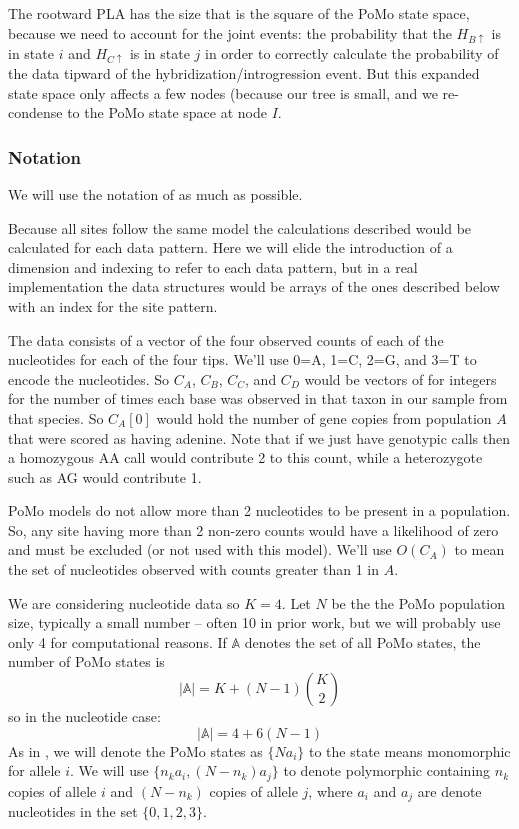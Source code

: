 \documentclass{article}
\begin{document}
The rootward PLA has the size that is the square of the PoMo state space, because we need to account for the joint events: the probability that the $H_{B\uparrow}$ is in state $i$ and $H_{C\uparrow}$ is in state $j$ in order to correctly calculate the probability of the data tipward of the hybridization/introgression event.
But this expanded state space only affects a few nodes (because our tree is small, and we re-condense to the PoMo state space at node $I$.

\subsubsection{Notation}
We will use the notation of \cite{borges2020consistency} as much as possible.

Because all sites follow the same model the calculations described would be calculated for each data pattern.
Here we will elide the introduction of a dimension and indexing to refer to each data pattern, but in a real implementation the data structures would be arrays of the ones described below with an index for the site pattern.

The data consists of a vector of the four observed counts of each of the nucleotides for each of the four tips. 
We'll use 0=A, 1=C, 2=G, and 3=T to encode the nucleotides. So $C_A$, $C_B$, $C_C$, and $C_D$ would be vectors of for integers for the number of times each base was observed in that taxon in our sample from that species.
So $C_A[0]$ would hold the number of gene copies from population $A$ that were scored as having adenine.
Note that if we just have genotypic calls then a homozygous AA call would contribute 2 to this count, while a heterozygote such as AG would contribute 1.



PoMo models do not allow more than 2 nucleotides to be present in a population. So, any site having more than 2 non-zero counts would have a likelihood of zero and must be excluded (or not used with this model).
We'll use $O(C_A)$ to mean the set of nucleotides observed with counts greater than 1 in $A$.




We are considering nucleotide data so $K=4$.
Let $N$ be the the PoMo population size, typically a small number -- often 10 in prior work, but we will probably use only 4 for computational reasons.
If $\mathbb{A}$ denotes the set of all PoMo states, the number of PoMo states is $$|\mathbb{A}| = K + (N-1) {K \choose 2} $$
so in the nucleotide case:
$$|\mathbb{A}| = 4 + 6(N-1)$$
As in \cite{borges2020consistency}, we will denote the PoMo states as $\{N a_i \}$ to the state means monomorphic for allele $i$.
We will use $\{n_k a_i, (N-n_k) a_j \}$  to denote polymorphic containing $n_k$ copies of allele $i$ and $(N-n_k)$ copies of allele $j$, where $a_i$ and $a_j$ are denote nucleotides in the set $\{0,1,2,3\}$.
\end{document}
